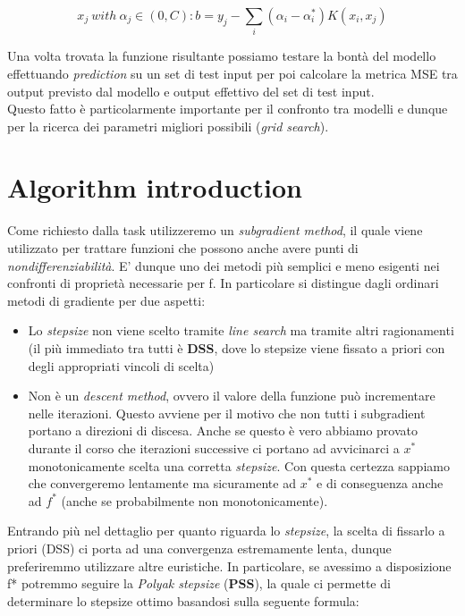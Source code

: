 \documentclass[12pt]{article}
\begin{document}
	\begin{equation}\label{eq:7}
		x_j \  with\  \alpha_j \in(0,C): b = y_j - \sum_i(\alpha_i - \alpha_i^*)K(x_i,x_j)
	\end{equation}

	Una volta trovata la funzione risultante possiamo testare la bontà del modello effettuando \textit{prediction} su un set di test input per poi calcolare la metrica MSE tra output previsto dal modello e output effettivo del set di test input.\\
Questo fatto è particolarmente importante per il confronto tra modelli e dunque per la ricerca dei parametri migliori possibili (\textit{grid search}).

	\section{Algorithm introduction}
	Come richiesto dalla task utilizzeremo un \textit{subgradient method}, il quale viene utilizzato per trattare funzioni che possono anche avere punti di \textit{nondifferenziabilità}. E’ dunque uno dei metodi più semplici e meno esigenti nei confronti di proprietà necessarie per f. In particolare si distingue dagli ordinari metodi di gradiente per due aspetti:
	\begin{itemize}
		\item Lo \textit{stepsize} non viene scelto tramite \textit{line search} ma tramite altri ragionamenti (il più immediato tra tutti è \textbf{DSS}, dove lo stepsize viene fissato a priori con degli appropriati vincoli di scelta)
		\item Non è un \textit{descent method}, ovvero il valore della funzione può incrementare nelle iterazioni. Questo avviene per il motivo che non tutti i subgradient portano a direzioni di discesa. Anche se questo è vero abbiamo provato durante il corso che iterazioni successive ci portano ad avvicinarci a $x^*$ monotonicamente scelta una corretta \textit{stepsize}. Con questa certezza sappiamo che convergeremo lentamente ma sicuramente ad $x^*$ e di conseguenza anche ad $f^*$ (anche se probabilmente non monotonicamente).  
	\end{itemize}
	Entrando più nel dettaglio per quanto riguarda lo \textit{stepsize}, la scelta di fissarlo a priori (DSS) ci porta ad una convergenza estremamente lenta, dunque preferiremmo utilizzare altre euristiche. In particolare, se avessimo a disposizione f* potremmo seguire la \textit{Polyak stepsize} (\textbf{PSS}), la quale ci permette di determinare lo stepsize ottimo basandosi sulla seguente formula:
	
\end{document}
